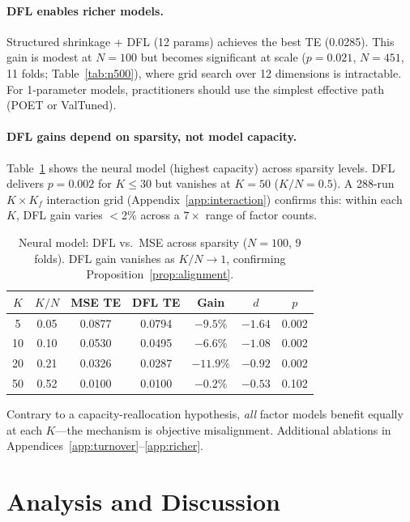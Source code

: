 \documentclass[letterpaper]{article}
\begin{document}
\paragraph{DFL enables richer models.} Structured shrinkage + DFL (12 params) achieves the best TE (0.0285). This gain is modest at $N{=}100$ but becomes significant at scale ($p = 0.021$, $N{=}451$, 11 folds; Table~\ref{tab:n500}), where grid search over 12 dimensions is intractable. For 1-parameter models, practitioners should use the simplest effective path (POET or ValTuned).

\paragraph{DFL gains depend on sparsity, not model capacity.}
Table~\ref{tab:sparsity} shows the neural model (highest capacity) across sparsity levels. DFL delivers $p = 0.002$ for $K \leq 30$ but vanishes at $K{=}50$ ($K/N = 0.5$). A 288-run $K \times K_f$ interaction grid (Appendix~\ref{app:interaction}) confirms this: within each $K$, DFL gain varies $<$2\% across a $7\times$ range of factor counts.

\begin{table}[t]
\centering
\caption{Neural model: DFL vs.\ MSE across sparsity ($N{=}100$, 9 folds). DFL gain vanishes as $K/N \to 1$, confirming Proposition~\ref{prop:alignment}.}
\label{tab:sparsity}
\small
\begin{tabular}{@{}ccccccc@{}}
\toprule
$K$ & $K/N$ & MSE TE & DFL TE & Gain & $d$ & $p$ \\
\midrule
5  & 0.05 & 0.0877 & 0.0794 & $-9.5\%$  & $-1.64$ & 0.002 \\
10 & 0.10 & 0.0530 & 0.0495 & $-6.6\%$  & $-1.08$ & 0.002 \\
20 & 0.21 & 0.0326 & 0.0287 & $-11.9\%$ & $-0.92$ & 0.002 \\
50 & 0.52 & 0.0100 & 0.0100 & $-0.2\%$  & $-0.53$ & 0.102 \\
\bottomrule
\end{tabular}
\end{table}

Contrary to a capacity-reallocation hypothesis, \emph{all} factor models benefit equally at each $K$---the mechanism is objective misalignment. Additional ablations in Appendices~\ref{app:turnover}--\ref{app:richer}.

\section{Analysis and Discussion}
\end{document}
